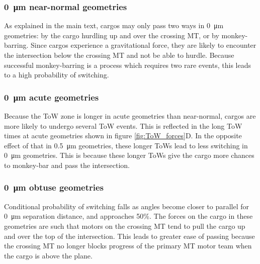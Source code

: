 \subsubsection*{\SI{0}{\micro\meter} near-normal geometries}

As explained in the main text, cargos may only pass two ways in \SI{0}{\micro\meter} geometries: by the cargo hurdling up and over the crossing MT, or by monkey-barring. Since cargos experience a gravitational force, they are likely to encounter the intersection below the crossing MT and not be able to hurdle. Because successful monkey-barring is a process which requires two rare events, this leads to a high probability of switching.

\subsubsection*{\SI{0}{\micro\meter} acute geometries}

Because the ToW zone is longer in acute geometries than near-normal, cargos are more likely to undergo several ToW events. This is reflected in the long ToW times at acute geometries shown in figure \ref{fig:ToW_forces}D. In the opposite effect of that in \SI{.5}{\micro\meter} geometries, these longer ToWs lead to less switching in \SI{0}{\micro\meter} geometries. This is because these longer ToWs give the cargo more chances to monkey-bar and pass the intersection.

\subsubsection*{\SI{0}{\micro\meter} obtuse geometries}

Conditional probability of switching falls as angles become closer to parallel for \SI{0}{\micro\meter} separation distance, and approaches 50\%. The forces on the cargo in these geometries are such that motors on the crossing MT tend to pull the cargo up and over the top of the intersection. This leads to greater ease of passing because the crossing MT no longer blocks progress of the primary MT motor team when the cargo is above the plane.


